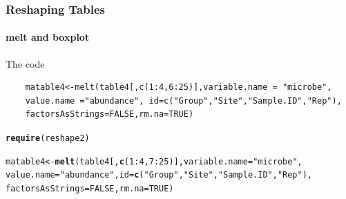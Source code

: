 \documentclass[12pt]{beamer}\usepackage[]{graphicx}\usepackage[]{color}
\makeatletter
\newcommand{\hlnum}[1]{\textcolor[rgb]{0.686,0.059,0.569}{#1}}%
\newcommand{\hlstr}[1]{\textcolor[rgb]{0.192,0.494,0.8}{#1}}%
\newcommand{\hlopt}[1]{\textcolor[rgb]{0,0,0}{#1}}%
\newcommand{\hlstd}[1]{\textcolor[rgb]{0.345,0.345,0.345}{#1}}%
\newcommand{\hlkwb}[1]{\textcolor[rgb]{0.69,0.353,0.396}{#1}}%
\newcommand{\hlkwc}[1]{\textcolor[rgb]{0.333,0.667,0.333}{#1}}%
\newcommand{\hlkwd}[1]{\textcolor[rgb]{0.737,0.353,0.396}{\textbf{#1}}}%
\newenvironment{kframe}{%
 \def\at@end@of@kframe{}%
 \ifinner\ifhmode%
  \def\at@end@of@kframe{\end{minipage}}%
  \begin{minipage}{\columnwidth}%
 \fi\fi%
 \def\FrameCommand##1{\hskip\@totalleftmargin \hskip-\fboxsep
 \colorbox{shadecolor}{##1}\hskip-\fboxsep
     \hskip-\linewidth \hskip-\@totalleftmargin \hskip\columnwidth}%
 \MakeFramed {\advance\hsize-\width
   \@totalleftmargin\z@ \linewidth\hsize
   \@setminipage}}%
 {\par\unskip\endMakeFramed%
 \at@end@of@kframe}
\newenvironment{knitrout}{}{} %
\makeatother
\begin{document}
\begin{frame}[fragile]
  \frametitle{Reshaping Tables}
  \framesubtitle{melt and boxplot}
  \begin{block}{The code}
  \end{block}
    \begin{lstlisting}
    matable4<-melt(table4[,c(1:4,6:25)],variable.name = "microbe",
    value.name ="abundance", id=c("Group","Site","Sample.ID","Rep"),
    factorsAsStrings=FALSE,rm.na=TRUE)
   \end{lstlisting}
   
\begin{knitrout}
\color{fgcolor}\begin{kframe}
\begin{alltt}
\hlkwd{require}\hlstd{(reshape2)}
\end{alltt}


{\ttfamily\noindent\itshape\color{messagecolor}{\#\# Loading required package: reshape2}}\begin{alltt}
\hlstd{matable4}\hlkwb{<-}\hlkwd{melt}\hlstd{(table4[,}\hlkwd{c}\hlstd{(}\hlnum{1}\hlopt{:}\hlnum{4}\hlstd{,}\hlnum{7}\hlopt{:}\hlnum{25}\hlstd{)],}\hlkwc{variable.name} \hlstd{=} \hlstr{"microbe"}\hlstd{,}
\hlkwc{value.name} \hlstd{=}\hlstr{"abundance"}\hlstd{,} \hlkwc{id}\hlstd{=}\hlkwd{c}\hlstd{(}\hlstr{"Group"}\hlstd{,}\hlstr{"Site"}\hlstd{,}\hlstr{"Sample.ID"}\hlstd{,}\hlstr{"Rep"}\hlstd{),}
\hlkwc{factorsAsStrings}\hlstd{=}\hlnum{FALSE}\hlstd{,}\hlkwc{rm.na}\hlstd{=}\hlnum{TRUE}\hlstd{)}
\end{alltt}
\end{kframe}
\end{knitrout}
\end{frame}  
\end{document}
